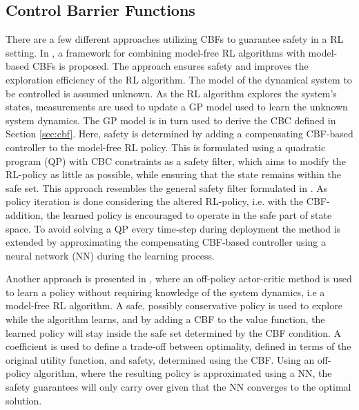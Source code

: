 \documentclass[3p,times,procedia]{elsarticle}
\begin{document}
\subsection{Control Barrier Functions}\label{sec:rl-cbf}
There are a few different approaches utilizing CBFs to guarantee safety in a RL setting. In \cite{Cheng2019}, a framework for combining model-free RL algorithms with model-based CBFs is proposed. The approach ensures safety and improves the exploration efficiency of the RL algorithm. The model of the  dynamical system to be controlled is assumed unknown. As the RL algorithm explores the system's states, measurements are used to update a GP model used to learn the unknown system dynamics. The GP model is in turn used to derive the CBC defined in Section \ref{sec:cbf}. Here, safety is determined by adding a compensating CBF-based controller to the model-free RL policy. This is formulated using a quadratic program (QP) with CBC constraints as a safety filter, which aims to modify the RL-policy as little as possible, while ensuring that the state remains within the safe set. This approach resembles the general safety filter formulated in \cite{Wabersich2018}. As policy iteration is done considering the altered RL-policy, i.e. with the CBF-addition, the learned policy is encouraged to operate in the safe part of state space. To avoid solving a QP every time-step during deployment the method is extended by approximating the compensating CBF-based controller using a neural network (NN) during the learning process.  

Another approach is presented in \cite{Marvi2020}, where an off-policy actor-critic method is used to learn a policy without requiring knowledge of the system dynamics, i.e a model-free RL algorithm. A safe, possibly conservative policy is used to explore while the algorithm learns, and by adding a CBF to the value function, the learned policy will stay inside the safe set determined by the CBF condition. A coefficient is used to define a trade-off between optimality, defined in terms of the original utility function, and safety, determined using the CBF. Using an off-policy algorithm, where the resulting policy is approximated using a NN, the safety guarantees will only carry over given that the NN converges to the optimal solution.
\end{document}
